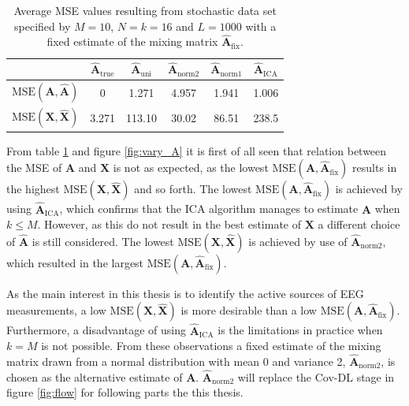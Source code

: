 \begin{table}[H]
\centering
\begin{tabular}{|c|c|c|c|c|c|}
\hline
 &  $\hat{\mathbf{A}}_{\text{true}}$ & $\hat{\mathbf{A}}_{\text{uni}}$ & $\hat{\mathbf{A}}_{\text{norm2}}$	 & $\hat{\mathbf{A}}_{\text{norm1}}$ & $\hat{\mathbf{A}}_{\text{ICA}}$ \\
\hline
$\text{MSE}(\mathbf{A}, \hat{\mathbf{A}})$ & 0 & 1.271 & 4.957 & 1.941 & 1.006 \\
\hline
$\text{MSE}(\mathbf{X}, \hat{\mathbf{X}})$ & 3.271 & 113.10 & 30.02 & 86.51 & 238.5 \\
\hline
\end{tabular}
\caption{Average MSE values resulting from stochastic data set specified by $M = 10$, $N = k = 16$ and $L = 1000$ with a fixed estimate of the mixing matrix $\hat{\mathbf{A}}_{\text{fix}}$.}
\label{tab:fixed}
\end{table}
\noindent
From table \ref{tab:fixed} and figure \ref{fig:vary_A} it is first of all seen that relation between the MSE of $\mathbf{A}$ and $\mathbf{X}$ is not as expected, as the lowest $\text{MSE}(\mathbf{A}, \hat{\mathbf{A}}_{\text{fix}})$ results in the highest $\text{MSE}(\mathbf{X}, \hat{\mathbf{X}})$ and so forth. 
The lowest $\text{MSE}(\mathbf{A}, \hat{\mathbf{A}}_{\text{fix}})$ is achieved by using $\hat{\mathbf{A}}_{\text{ICA}}$, which confirms that the ICA algorithm manages to estimate $\mathbf{A}$ when $k \leq M$. 
However, as this do not result in the best estimate of $\mathbf{X}$ a different choice of $\hat{\mathbf{A}}$ is still considered. 
The lowest $\text{MSE}(\mathbf{X}, \hat{\mathbf{X}})$ is achieved by use of $\hat{\mathbf{A}}_{\text{norm2}}$, which resulted in the largest $\text{MSE}(\mathbf{A}, \hat{\mathbf{A}}_{\text{fix}})$. 
      
As the main interest in this thesis is to identify the active sources of EEG measurements, a low $\text{MSE}(\mathbf{X}, \hat{\mathbf{X}})$ is more desirable than a low $\text{MSE}(\mathbf{A}, \hat{\mathbf{A}}_{\text{fix}})$. 
Furthermore, a disadvantage of using $\hat{\mathbf{A}}_{\text{ICA}}$ is the limitations in practice when $k = M$ is not possible. 
From these observations a fixed estimate of the mixing matrix drawn from a normal distribution with mean 0 and variance 2, $\hat{\mathbf{A}}_{\text{norm2}}$, is chosen as the alternative estimate of $\mathbf{A}$. 
$\hat{\mathbf{A}}_{\text{norm2}}$ will replace the Cov-DL stage in figure \ref{fig:flow} for following parts the this thesis. 

